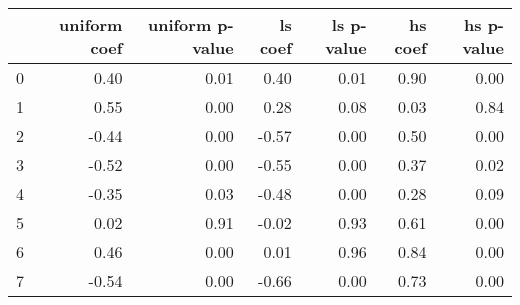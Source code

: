 \begin{tabular}{lrrrrrr}
\toprule
 & uniform coef & uniform p-value & ls coef & ls p-value & hs coef & hs p-value \\
\midrule
0 & 0.40 & 0.01 & 0.40 & 0.01 & 0.90 & 0.00 \\
1 & 0.55 & 0.00 & 0.28 & 0.08 & 0.03 & 0.84 \\
2 & -0.44 & 0.00 & -0.57 & 0.00 & 0.50 & 0.00 \\
3 & -0.52 & 0.00 & -0.55 & 0.00 & 0.37 & 0.02 \\
4 & -0.35 & 0.03 & -0.48 & 0.00 & 0.28 & 0.09 \\
5 & 0.02 & 0.91 & -0.02 & 0.93 & 0.61 & 0.00 \\
6 & 0.46 & 0.00 & 0.01 & 0.96 & 0.84 & 0.00 \\
7 & -0.54 & 0.00 & -0.66 & 0.00 & 0.73 & 0.00 \\
\bottomrule
\end{tabular}
